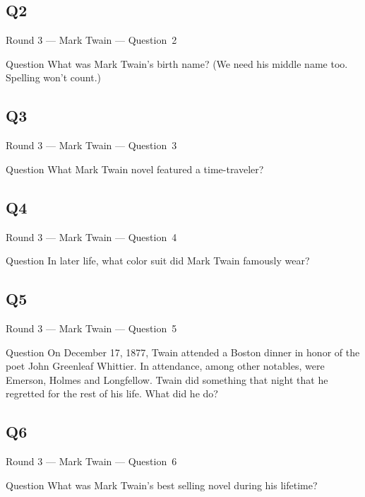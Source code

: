 \documentclass[11pt]{beamer}
\begin{document}
\subsection*{Q2}
\begin{frame}[t]{Round 3 --- Mark Twain --- \mbox{Question 2}}
\vspace{-0.5em}
\begin{block}{Question}
What was Mark Twain's birth name? (We need his middle name too. Spelling won't count.)
\end{block}
\end{frame}
\subsection*{Q3}
\begin{frame}[t]{Round 3 --- Mark Twain --- \mbox{Question 3}}
\vspace{-0.5em}
\begin{block}{Question}
What Mark Twain novel featured a time-traveler?
\end{block}
\end{frame}
\subsection*{Q4}
\begin{frame}[t]{Round 3 --- Mark Twain --- \mbox{Question 4}}
\vspace{-0.5em}
\begin{block}{Question}
In later life, what color suit did Mark Twain famously wear?
\end{block}
\end{frame}
\subsection*{Q5}
\begin{frame}[t]{Round 3 --- Mark Twain --- \mbox{Question 5}}
\vspace{-0.5em}
\begin{block}{Question}
On December 17, 1877, Twain attended a Boston dinner in honor of the poet John Greenleaf Whittier. In attendance, among other notables, were Emerson, Holmes and Longfellow.  Twain did something that night that he regretted for the rest of his life. What did he do? 
\end{block}
\end{frame}
\subsection*{Q6}
\begin{frame}[t]{Round 3 --- Mark Twain --- \mbox{Question 6}}
\vspace{-0.5em}
\begin{block}{Question}
What was Mark Twain's best selling novel during his lifetime?
\end{block}
\end{frame}
\end{document}
